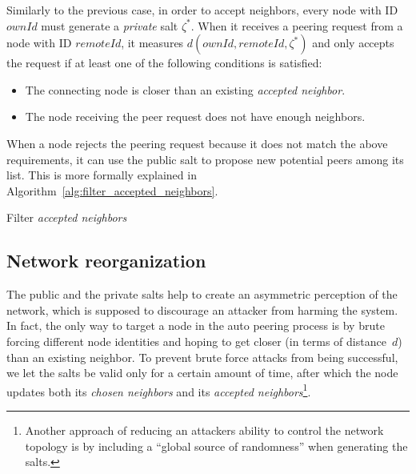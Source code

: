 \documentclass[../main.tex]{subfiles}
\begin{document}
Similarly to the previous case, in order to accept neighbors, every node with ID~$ownId$ must generate a \textit{private} salt $\zeta^*$. When it receives a peering request from a node with ID $remoteId$, it measures $d(ownId, remoteId, \zeta^*)$ and only accepts the request if at least one of the following conditions is satisfied:
\begin{itemize}
    \item The connecting node is closer than an existing \emph{accepted neighbor}.
    \item The node receiving the peer request does not have enough neighbors.
\end{itemize}

When a node rejects the peering request because it does not match the above requirements, it can use the public salt to propose new potential peers among its list. This is more formally explained in Algorithm~\ref{alg:filter_accepted_neighbors}.

\begin{algorithm}[htb]
\DontPrintSemicolon
{}
\BlankLine
{}

\caption{Filter \emph{accepted neighbors}}
\label{alg:filter_accepted_neighbors}
\end{algorithm}

\subsection{Network reorganization}

The public and the private salts help to create an asymmetric perception of the network, which is supposed to discourage an attacker from harming the system. In fact, the only way to target a node in the auto peering process is by brute forcing different node identities and hoping to get closer (in terms of distance~$d$) than an existing neighbor. To prevent brute force attacks from being successful, we let the salts be valid only for a certain amount of time, after which the node updates both its \emph{chosen neighbors} and its \emph{accepted neighbors}\footnote{Another approach of reducing an attackers ability to control the network topology is by including a \enquote{global source of randomness} when generating the salts.}.
\end{document}
